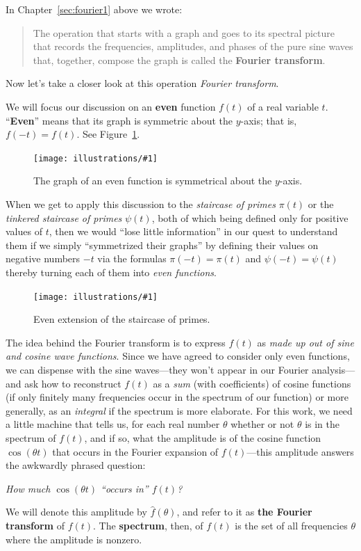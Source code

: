 \documentclass[openany]{book}
\newcommand{\ill}[3]{%
   \begin{figure}[H]%
   \vspace{-2ex}
   \centering%
   \texttt{[image: illustrations/\#1]}%
   \caption{#3}%
   \vspace{-2ex}
    \end{figure}}
\theoremstyle{plain}
\theoremstyle{definition}
\begin{document}
{In Chapter~\ref{sec:fourier1} above we wrote:

\begin{quote} The operation that starts with a graph and goes to its
  spectral picture that records the frequencies, amplitudes, and
  phases of the pure sine waves that, together, compose the graph is
  called the {\bf Fourier transform}.
\end{quote}


  Now let's take a closer look at this operation {\it Fourier transform}.

  We will focus our discussion on an {\bf even} function $f(t)$ of a
  real variable $t$.  ``{\bf Even}'' means that its graph is symmetric
  about the $y$-axis; that is, $f(-t)= f(t)$.  See
  Figure~\ref{fig:even_function}.

  \ill{even_function}{.8}{The graph of an even function is symmetrical
    about the $y$-axis.\label{fig:even_function}}

  When we get to apply this discussion to the {\it staircase of
    primes} $\pi(t)$ or the {\it tinkered staircase of primes}
  $\psi(t)$, both of which being defined only for positive values of
  $t$, then we would ``lose little information'' in our quest to
  understand them if we simply ``symmetrized their graphs'' by
  defining their values on negative numbers $-t$ via the formulas
  $\pi(-t)=\pi(t)$ and $\psi(-t)=\psi(t)$ thereby turning each of them
  into {\it even functions}.

\ill{even_pi}{.8}{Even extension of the staircase of primes.}

The idea behind the Fourier transform is to express $f(t)$ as {\it
  made up out of sine and cosine wave functions}.  Since we have
agreed to consider only even functions, we can dispense with the sine
waves---they won't appear in our Fourier analysis---and ask how to
reconstruct $f(t)$ as a {\it sum} (with coefficients) of cosine
functions (if only finitely many frequencies occur in the spectrum of
our function) or more generally, as an {\it integral} if the spectrum
is more elaborate.  For this work, we need a little machine that tells
us, for each real number $\theta$ whether or not $\theta$ is in the
spectrum of $f(t)$, and if so, what the amplitude is of the cosine
function $\cos(\theta t)$ that occurs in the Fourier expansion of
$f(t)$---this amplitude answers the awkwardly phrased question:

{\it
  How much $\cos(\theta t)$ ``occurs in'' $f(t)$?}

  We will denote this
amplitude by ${\hat f}(\theta)$, and refer to it as {\bf the Fourier
  transform} of $f(t)$.  The {\bf spectrum}, then, of $f(t)$ is the
set of all frequencies $\theta$ where the amplitude is nonzero.


}
\end{document}
